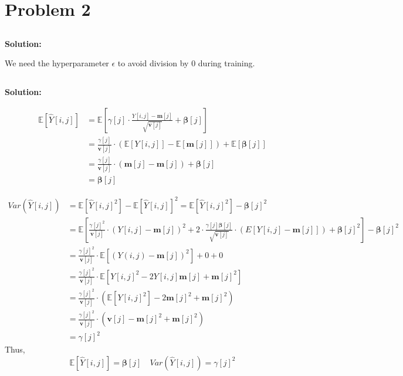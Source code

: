 \documentclass{article}
\newenvironment{solution}
  {\par\noindent\textbf{Solution:}\par}
  {\par}
\begin{document}
\section{Problem 2}
\subsection{}
\begin{solution}
We need the hyperparameter $\epsilon$ to avoid division by 0 during training.
\end{solution}

\subsection{}
\begin{solution}
  \[
    \begin{aligned}
\mathbb{E}[\hat{Y}[i,j]] &= \mathbb{E}\left[ \gamma[j] \cdot \frac{Y[i,j] -\mathbf{m}[j]}{\sqrt{\mathbf{v}[j]}} +\boldsymbol{\beta}[j]\right] \\ 
                         &= \frac{\gamma[j]}{\textbf{v}[j]} \cdot \left(\mathbb{E} \left[ Y[i,j] \right]  - \mathbb{E}[\textbf{m}[j]] \right) + \mathbb{E}[\boldsymbol{\beta}[j]]  \\
                         &=  \frac{\gamma[j]}{\textbf{v}[j]} \cdot \left( \textbf{m}[j] - \textbf{m}[j] \right) + \boldsymbol{\beta}[j] \\ 
                         &= \boldsymbol{\beta}[j]
  \end{aligned}
\]

\[
  \begin{aligned}
    Var(\hat{Y}[i,j]) &= \mathbb{E}[\hat{Y}[i,j]^2] - \mathbb{E}[\hat{Y}[i,j]]^2 = \mathbb{E}[\hat{Y}[i,j]^2] - \boldsymbol{\beta}[j]^2\\ 
                      &= \mathbb{E}\left[ \frac{\gamma[j]^2}{\textbf{v}[j]} \cdot (Y[i,j] - \textbf{m}[j])^2 + 2\cdot \frac{\gamma[j] \boldsymbol{\beta}[j]}{\sqrt{\textbf{v}[j]}} \cdot \left( E\left[Y[i,j]  - \textbf{m}[j]\right] \right)  + \boldsymbol{\beta}[j]^2\right]- \boldsymbol{\beta}[j]^2 \\ 
                      &= \frac{\gamma[j]^2}{\textbf{v}[j]} \cdot \mathbb{E}\left[ \left( Y(i,j) - \textbf{m}[j]\right)^2 \right] + 0 + 0 \\ 
                      &= \frac{\gamma[j]^2}{\textbf{v}[j]}\cdot \mathbb{E}\left[ Y[i,j]^2 -2Y[i,j]\textbf{m}[j] + \textbf{m}[j]^2 \right] \\ 
                      &= \frac{\gamma[j]^2}{\textbf{v}[j]}\cdot \left( \mathbb{E}\left[ Y[i,j]^2\right] - 2\textbf{m}[j]^2 + \textbf{m}[j]^2 \right) \\ 
                      &= \frac{\gamma[j]^2}{\textbf{v}[j]}\cdot \left( \textbf{v}[j] - \textbf{m}[j]^2 + \textbf{m}[j]^2  \right)  
          \\            &= \gamma[j]^2
  \end{aligned}
\]
  Thus,
  $$\mathbb{E}\left[ \hat{Y}[i,j] \right]= \boldsymbol{\beta}[j] \quad Var(\hat{Y}[i,j]) = \gamma[j]^2$$
\end{solution}
\end{document}
